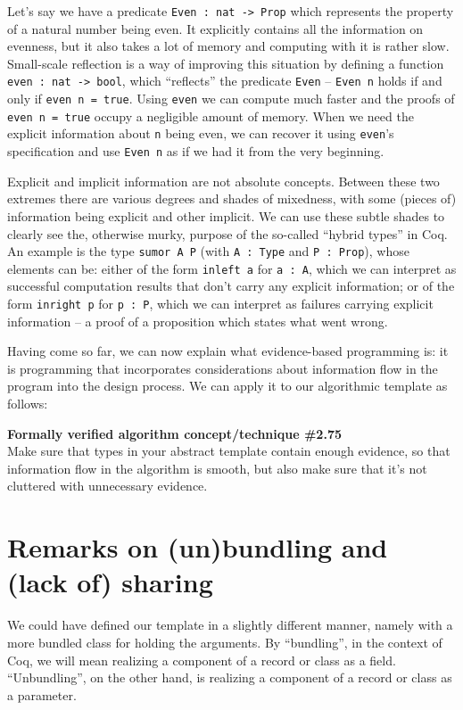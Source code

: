 \documentclass[declaration,mgr,english,shortabstract]{iithesis}
\newcommand{\m}[1]{\texttt{#1}}
\begin{document}
Let's say we have a predicate \m{Even\ :\ nat -> Prop} which represents the property of a natural number being even. It explicitly contains all the information on evenness, but it also takes a lot of memory and computing with it is rather slow. Small-scale reflection is a way of improving this situation by defining a function \m{even\ :\ nat -> bool}, which ``reflects'' the predicate \m{Even} -- \m{Even n} holds if and only if \m{even n = true}. Using \m{even} we can compute much faster and the proofs of \m{even n = true} occupy a negligible amount of memory. When we need the explicit information about \m{n} being even, we can recover it using \m{even}'s specification and use \m{Even n} as if we had it from the very beginning.

Explicit and implicit information are not absolute concepts. Between these two extremes there are various degrees and shades of mixedness, with some (pieces of) information being explicit and other implicit. We can use these subtle shades to clearly see the, otherwise murky, purpose of the so-called ``hybrid types'' in Coq. An example is the type \m{sumor A P} (with \m{A\ :\ Type} and \m{P\ :\ Prop}), whose elements can be: either of the form \m{inleft a} for \m{a\ :\ A}, which we can interpret as successful computation results that don't carry any explicit information; or of the form \m{inright p} for \m{p\ :\ P}, which we can interpret as failures carrying explicit information -- a proof of a proposition which states what went wrong.

Having come so far, we can now explain what evidence-based programming is: it is programming that incorporates considerations about information flow in the program into the design process. We can apply it to our algorithmic template as follows:

\begin{center}
    \textbf{Formally verified algorithm concept/technique \#2.75} \\
    Make sure that types in your abstract template contain enough evidence, so that information flow in the algorithm is smooth, but also make sure that it's not cluttered with unnecessary evidence.
\end{center}

\section{Remarks on (un)bundling and (lack of) sharing}

We could have defined our template in a slightly different manner, namely with a more bundled class for holding the arguments. By ``bundling'', in the context of Coq, we will mean realizing a component of a record or class as a field. ``Unbundling'', on the other hand, is realizing a component of a record or class as a parameter.
\end{document}
